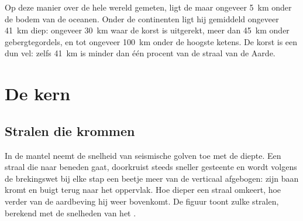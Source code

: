Op deze manier over de hele wereld gemeten, ligt de  maar ongeveer
\qty{5}{km} onder de bodem van de oceanen. Onder de continenten ligt hij gemiddeld
ongeveer \qty{41}{km} diep: ongeveer \qty{30}{km} waar de korst is uitgerekt,
meer dan \qty{45}{km} onder gebergtegordels, en tot ongeveer \qty{100}{km} onder
de hoogste ketens. De korst is een dun vel: zelfs \qty{41}{km} is minder dan één
procent van de straal van de Aarde.

\section{De kern}

\subsection{Stralen die krommen}

In de mantel neemt de snelheid van seismische golven toe met de diepte. Een straal
die naar beneden gaat, doorkruist steeds sneller gesteente en wordt volgens de
brekingswet bij elke stap een beetje meer van de verticaal afgebogen: zijn baan
kromt en buigt terug naar het oppervlak. Hoe dieper een straal omkeert, hoe verder
van de aardbeving hij weer bovenkomt. De figuur toont zulke stralen, berekend met
de snelheden van het .

